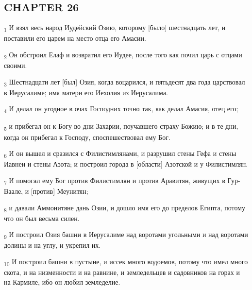 \subsection{CHAPTER 26}
\begin{tcolorbox}
\textsubscript{1} И взял весь народ Иудейский Озию, которому [было] шестнадцать лет, и поставили его царем на место отца его Амасии.
\end{tcolorbox}
\begin{tcolorbox}
\textsubscript{2} Он обстроил Елаф и возвратил его Иудее, после того как почил царь с отцами своими.
\end{tcolorbox}
\begin{tcolorbox}
\textsubscript{3} Шестнадцати лет [был] Озия, когда воцарился, и пятьдесят два года царствовал в Иерусалиме; имя матери его Иехолия из Иерусалима.
\end{tcolorbox}
\begin{tcolorbox}
\textsubscript{4} И делал он угодное в очах Господних точно так, как делал Амасия, отец его;
\end{tcolorbox}
\begin{tcolorbox}
\textsubscript{5} и прибегал он к Богу во дни Захарии, поучавшего страху Божию; и в те дни, когда он прибегал к Господу, споспешествовал ему Бог.
\end{tcolorbox}
\begin{tcolorbox}
\textsubscript{6} И он вышел и сразился с Филистимлянами, и разрушил стены Гефа и стены Иавнеи и стены Азота; и построил города в [области] Азотской и у Филистимлян.
\end{tcolorbox}
\begin{tcolorbox}
\textsubscript{7} И помогал ему Бог против Филистимлян и против Аравитян, живущих в Гур-Ваале, и [против] Меунитян;
\end{tcolorbox}
\begin{tcolorbox}
\textsubscript{8} и давали Аммонитяне дань Озии, и дошло имя его до пределов Египта, потому что он был весьма силен.
\end{tcolorbox}
\begin{tcolorbox}
\textsubscript{9} И построил Озия башни в Иерусалиме над воротами угольными и над воротами долины и на углу, и укрепил их.
\end{tcolorbox}
\begin{tcolorbox}
\textsubscript{10} И построил башни в пустыне, и иссек много водоемов, потому что имел много скота, и на низменности и на равнине, и земледельцев и садовников на горах и на Кармиле, ибо он любил земледелие.
\end{tcolorbox}
